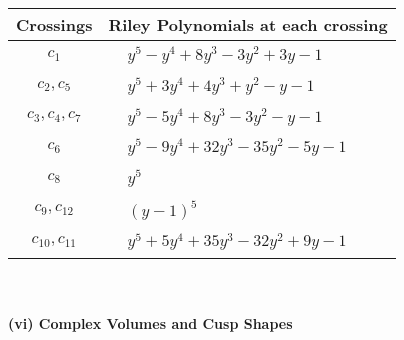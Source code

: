 \documentclass[1p]{elsarticle_modified}
\theoremstyle{definition}
\begin{document}
\begin{tabular}{m{50pt}|m{274pt}}
Crossings & \hspace{64pt}Riley Polynomials at each crossing \\
\hline $$\begin{aligned}c_{1}\end{aligned}$$&$\begin{aligned}
&y^5- y^4+8 y^3-3 y^2+3 y-1
\end{aligned}$\\
\hline $$\begin{aligned}c_{2},c_{5}\end{aligned}$$&$\begin{aligned}
&y^5+3 y^4+4 y^3+y^2- y-1
\end{aligned}$\\
\hline $$\begin{aligned}c_{3},c_{4},c_{7}\end{aligned}$$&$\begin{aligned}
&y^5-5 y^4+8 y^3-3 y^2- y-1
\end{aligned}$\\
\hline $$\begin{aligned}c_{6}\end{aligned}$$&$\begin{aligned}
&y^5-9 y^4+32 y^3-35 y^2-5 y-1
\end{aligned}$\\
\hline $$\begin{aligned}c_{8}\end{aligned}$$&$\begin{aligned}
&y^5
\end{aligned}$\\
\hline $$\begin{aligned}c_{9},c_{12}\end{aligned}$$&$\begin{aligned}
&(y-1)^5
\end{aligned}$\\
\hline $$\begin{aligned}c_{10},c_{11}\end{aligned}$$&$\begin{aligned}
&y^5+5 y^4+35 y^3-32 y^2+9 y-1
\end{aligned}$\\
\hline
\end{tabular}\\~\\
\newpage\flushleft \textbf{(vi) Complex Volumes and Cusp Shapes}
\end{document}
